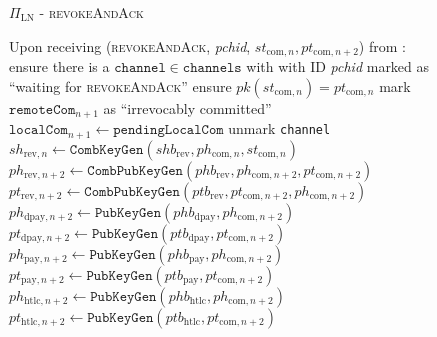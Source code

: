 \begin{figure}[!htbp]
\begin{protocolbox}{$\Pi_{\mathrm{LN}}$ - \textsc{revokeAndAck}}
  \begin{algorithmic}[1]
    \State Upon receiving (\textsc{revokeAndAck}, \textit{pchid},
    $st_{\mathrm{com}, n}, pt_{\mathrm{com}, n+2}$) from \bob:
    \Indent
      \State ensure there is a $\mathtt{channel} \in \mathtt{channels}$ with
      \bob{} with ID \textit{pchid} marked as ``waiting for
      \textsc{revokeAndAck}''
      \State ensure $pk\left(st_{\mathrm{com}, n}\right) = pt_{\mathrm{com}, n}$
      \State mark $\mathtt{remoteCom}_{n+1}$ as ``irrevocably committed''
      \State $\mathtt{localCom}_{n+1} \gets \mathtt{pendingLocalCom}$
      \State unmark \texttt{channel}
      \State $sh_{\mathrm{rev}, n} \gets
      \mathtt{CombKeyGen}\left(shb_{\mathrm{rev}}, ph_{\mathrm{com}, n},
      st_{\mathrm{com}, n}\right)$
      \State $ph_{\mathrm{rev}, n+2} \gets
      \mathtt{CombPubKeyGen}\left(phb_{\mathrm{rev}}, ph_{\mathrm{com}, n+2},
      pt_{\mathrm{com}, n+2}\right)$
      \State $pt_{\mathrm{rev}, n+2} \gets
      \mathtt{CombPubKeyGen}\left(ptb_{\mathrm{rev}}, pt_{\mathrm{com}, n+2},
      ph_{\mathrm{com}, n+2}\right)$
      \State $ph_{\mathrm{dpay}, n+2} \gets
      \texttt{PubKeyGen}\left(phb_{\mathrm{dpay}}, ph_{\mathrm{com},
      n+2}\right)$
      \State $pt_{\mathrm{dpay}, n+2} \gets
      \texttt{PubKeyGen}\left(ptb_{\mathrm{dpay}}, pt_{\mathrm{com},
      n+2}\right)$
      \State $ph_{\mathrm{pay}, n+2} \gets
      \texttt{PubKeyGen}\left(phb_{\mathrm{pay}}, ph_{\mathrm{com}, n+2}\right)$
      \State $pt_{\mathrm{pay}, n+2} \gets
      \texttt{PubKeyGen}\left(ptb_{\mathrm{pay}}, pt_{\mathrm{com}, n+2}\right)$
      \State $ph_{\mathrm{htlc}, n+2} \gets
      \texttt{PubKeyGen}\left(phb_{\mathrm{htlc}}, ph_{\mathrm{com},
      n+2}\right)$
      \State $pt_{\mathrm{htlc}, n+2} \gets
      \texttt{PubKeyGen}\left(ptb_{\mathrm{htlc}}, pt_{\mathrm{com},
      n+2}\right)$
    \EndIndent
  \end{algorithmic}
\end{protocolbox}
\caption{}
\label{alg:protocol:pay:revokeAndAck}
\end{figure}

